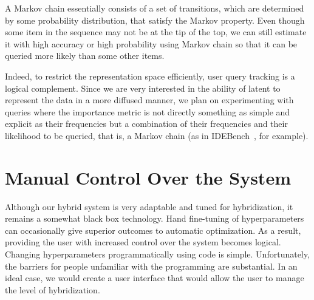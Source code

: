 A Markov chain essentially consists of a set of transitions, which are determined by some probability distribution, that satisfy the Markov property. Even though some item in the sequence may not be at the tip of the top, we can still estimate it with high accuracy or high probability using Markov chain so that it can be queried more likely than some other items.

Indeed, to restrict the representation space efficiently, user query tracking is a logical complement. Since we are very interested in the ability of latent to represent the data in a more diffused manner, we plan on experimenting with queries where the importance metric is not directly something as simple and explicit as their frequencies but a combination of their frequencies and their likelihood to be queried, that is, a Markov chain (as in IDEBench~\cite{eichmann2020idebench}, for example).



\section{Manual Control Over the System}

Although our hybrid system is very adaptable and tuned for hybridization, it remains a somewhat black box technology. Hand fine-tuning of hyperparameters can occasionally give superior outcomes to automatic optimization. As a result, providing the user with increased control over the system becomes logical. Changing hyperparameters programmatically using code is simple. Unfortunately, the barriers for people unfamiliar with the programming are substantial.
In an ideal case, we would create a user interface that would allow the user to manage the level of hybridization. 

